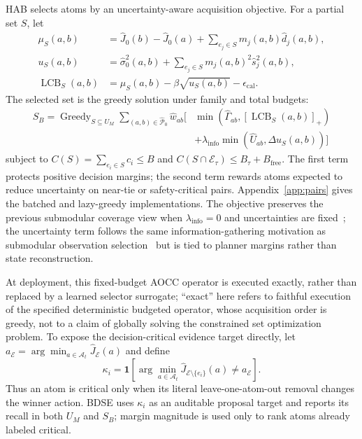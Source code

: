 \documentclass{article}
\newcommand{\A}{\mathcal{A}}
\newcommand{\E}{\mathcal{E}}
\begin{document}
HAB selects atoms by an uncertainty-aware acquisition objective. For a partial set $S$, let
\begin{align}
    \mu_S(a,b)&=\hat J_0(b)-\hat J_0(a)+\sum_{e_j\in S}m_j(a,b)\hat d_j(a,b),\nonumber\\
    u_S(a,b)&=\hat\sigma_0^2(a,b)+\sum_{e_j\in S}m_j(a,b)^2\hat s_j^2(a,b),\nonumber\\
    \operatorname{LCB}_S(a,b)&=\mu_S(a,b)-\beta\sqrt{u_S(a,b)}-\epsilon_{\mathrm{cal}} .
\end{align}
The selected set is the greedy solution under family and total budgets:
\begin{equation}
\begin{split}
    S_B=\operatorname{Greedy}_{S\subseteq U_M}
    \sum_{(a,b)\in\widehat{\mathcal P}_0}\hat w_{ab}
    \Big[&
    \min\!\left(\hat\Gamma_{ab},[\operatorname{LCB}_S(a,b)]_+\right)\\
    &+\lambda_{\mathrm{info}}
    \min\!\left(\hat U_{ab},\Delta u_S(a,b)\right)
    \Big]
\end{split}
\label{eq:hab_objective}
\end{equation}
subject to $C(S)=\sum_{e_i\in S}c_i\le B$ and $C(S\cap\E_\tau)\le B_\tau+B_{\mathrm{free}}$. The first term protects positive decision margins; the second term rewards atoms expected to reduce uncertainty on near-tie or safety-critical pairs. Appendix~\ref{app:pairs} gives the batched and lazy-greedy implementations. The objective preserves the previous submodular coverage view when $\lambda_{\mathrm{info}}=0$ and uncertainties are fixed~\cite{nemhauser1978analysis}; the uncertainty term follows the same information-gathering motivation as submodular observation selection~\cite{krause2008near} but is tied to planner margins rather than state reconstruction.

At deployment, this fixed-budget AOCC operator is executed exactly, rather than replaced by a learned selector surrogate; ``exact'' here refers to faithful execution of the specified deterministic budgeted operator, whose acquisition order is greedy, not to a claim of globally solving the constrained set optimization problem. To expose the decision-critical evidence target directly, let $a_{\E}=\arg\min_{a\in\A_t}\hat J_{\E}(a)$ and define
\begin{equation}
    \kappa_i=\mathbf{1}\!\left[\arg\min_{a\in\A_t}\hat J_{\E\setminus\{e_i\}}(a)\ne a_{\E}\right].
    \label{eq:exact_critical_atom}
\end{equation}
Thus an atom is critical only when its literal leave-one-atom-out removal changes the winner action. BDSE uses $\kappa_i$ as an auditable proposal target and reports its recall in both $U_M$ and $S_B$; margin magnitude is used only to rank atoms already labeled critical.
\end{document}
